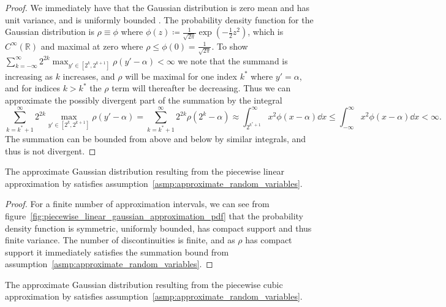 \documentclass[manuscript,review]{acmart}
\begin{document}
\begin{proof}
We immediately have that the Gaussian distribution is zero mean and has unit variance, and is uniformly bounded \citep[appendix~C.2]{blundell2014concepts}. The probability density function for the Gaussian distribution is $ \rho \equiv \phi $ where $ \phi(z) \coloneqq \tfrac{1}{\sqrt{2\pi}} {\exp}(-\tfrac{1}{2}z^2) $, which is $ C^\infty(\mathbb{R}) $ and maximal at zero where $ \rho \leq \phi(0) = \tfrac{1}{\sqrt{2\pi}} $. To show $ \sum_{k=-\infty}^\infty 2^{2k} \max_{y'\in[2^{k}, 2^{k+1}]} \rho(y'-\alpha) < \infty $ we note that the summand is increasing as $ k $ increases, and $ \rho $ will be maximal for one index $ k^* $ where $ y' = \alpha $, and for indices $ k > k^* $ the $ \rho $ term will thereafter be decreasing. Thus we can approximate the possibly divergent part of the summation by the integral 
\begin{equation*}
\sum_{k=k^* + 1}^\infty 2^{2k} \max_{y'\in[2^{k}, 2^{k+1}]} \rho(y'-\alpha) = \sum_{k=k^* + 1}^\infty 2^{2k}  \rho(2^k-\alpha)
\approx \int_{2^{k^* + 1}}^\infty  x^2  \phi(x-\alpha) \dd{x}
\leq \int_{-\infty}^\infty  x^2  \phi(x-\alpha) \dd{x} < \infty.
\end{equation*}
The summation can be bounded from above and below by similar integrals, and thus is not divergent. 
\qedhere
\end{proof}

\begin{lemma}
\label{lemma:approximate_gaussian_distribution_linear}
The approximate Gaussian distribution resulting from the piecewise linear approximation by \citet{giles2020approximating} satisfies assumption~\ref{asmp:approximate_random_variables}.
\end{lemma}

\begin{proof}
For a finite number of approximation intervals, we can see from figure~\ref{fig:piecewise_linear_gaussian_approximation_pdf} that the probability density function is symmetric, uniformly bounded, has compact support and thus finite variance. The number of discontinuities is finite, and as $ \rho $ has compact support it immediately satisfies the summation bound from assumption~\ref{asmp:approximate_random_variables}. \qedhere
\end{proof}

\begin{lemma}
\label{lemma:approximate_gaussian_distribution_cubic}
The approximate Gaussian distribution resulting from the piecewise cubic approximation by \citet{giles2020approximating} satisfies assumption~\ref{asmp:approximate_random_variables}.
\end{lemma}
\end{document}

